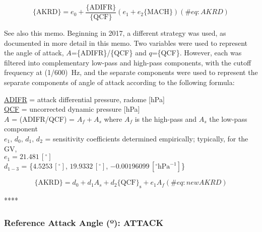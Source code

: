 \documentclass[
  english,
]{book}
\begin{document}
\begin{equation}
\mathrm{\{AKRD\}}=e_{0}+\frac{\{\mathrm{ADIFR}\}}{\{\mathrm{QCF}\}}\left(e_{1}+e{}_{2}\mathrm{\{MACH\}}\right)
(\#eq:AKRD)
\end{equation}

See also this memo. Beginning in 2017, a different strategy was used, as
documented in more detail in this memo. Two variables were used to
represent the angle of attack, \(A\)=\{ADIFR\}/\{QCF\} and
\(q\)=\{QCF\}. However, each was filtered into complementary low-pass
and high-pass components, with the cutoff frequency at (1/600)~Hz, and
the separate components were used to represent the separate components
of angle of attack according to the following formula:

\protect\hyperlink{adifr}{ADIFR} = attack differential pressure, radome
{[}hPa{]}\\
\protect\hyperlink{qcx}{QCF} = uncorrected dynamic pressure {[}hPa{]}\\
\(A\) = (ADIFR/QCF) = \(A_{f}+A_{s}\) where \(A_{f}\) is the high-pass
and \(A_{s}\) the low-pass component\\
\(e_{1},\,d_{0},\,d{}_{1},\,d_{2}\) = sensitivity coefficients
determined empirically; typically, for the GV,\\
\hspace*{0.333em}\hspace*{0.333em}\hspace*{0.333em}\hspace*{0.333em}\hspace*{0.333em}\(e_{1}=21.481\,[^{\circ}]\)\\
\hspace*{0.333em}\hspace*{0.333em}\hspace*{0.333em}\hspace*{0.333em}\hspace*{0.333em}\(d_{1-3}\)
= \{\(4.5253\,[^{\circ}]\), \(19.9332\,[^{\circ}]\),
\(-0.00196099\,[^{\circ}\mathrm{hPa}^{-1}]\)\}

\begin{equation}
\mathrm{\{AKRD\}}=d_{0}+d_{1}A_{s}+d_{2}\mathrm{\{QCF\}_{s}+}e_{1}A_{f}
(\#eq:newAKRD)
\end{equation}

****

\hypertarget{attack}{%
\subsubsection*{\texorpdfstring{Reference Attack Angle ({º}):
ATTACK}{Reference Attack Angle (º): ATTACK}}\label{attack}}
\end{document}
